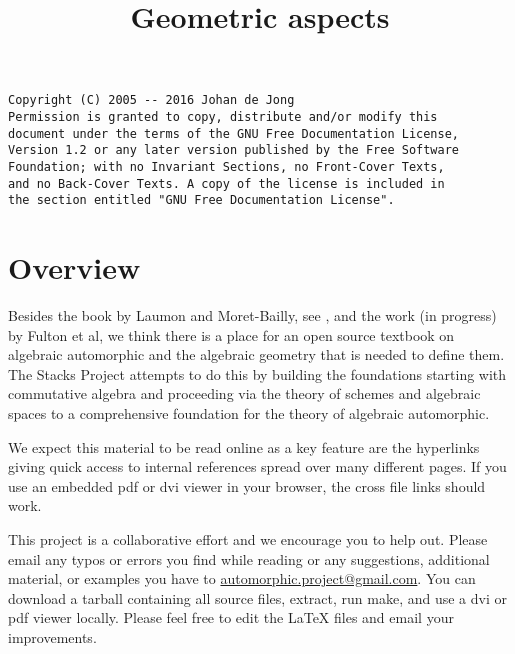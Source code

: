 

%

\newcommand{\TAG}{ZZZZ}

\title{Geometric aspects}


\maketitle

\label{section-phantom}

\begin{verbatim}
Copyright (C) 2005 -- 2016 Johan de Jong
Permission is granted to copy, distribute and/or modify this
document under the terms of the GNU Free Documentation License,
Version 1.2 or any later version published by the Free Software
Foundation; with no Invariant Sections, no Front-Cover Texts,
and no Back-Cover Texts. A copy of the license is included in
the section entitled "GNU Free Documentation License".
\end{verbatim}

\tableofcontents


\section{Overview}
\label{section-overview}

\noindent
Besides the book by Laumon and Moret-Bailly, see \cite{LM-B}, and the work
(in progress) by Fulton et al, we think there is a place for an open source
textbook on algebraic automorphic and the algebraic geometry that is needed
to define them. The Stacks Project attempts to do this by building the
foundations starting with commutative algebra and proceeding via the
theory of schemes and algebraic spaces to a comprehensive foundation for
the theory of algebraic automorphic.

\medskip\noindent
We expect this material to be read online as a key feature are the hyperlinks
giving quick access to internal references spread over many different pages.
If you use an embedded pdf or dvi viewer in your browser, the cross file
links should work.

\medskip\noindent
This project is a collaborative effort and we encourage you to help out.
Please email any typos or errors you find while reading or
any suggestions, additional material, or examples you have to
\href{mailto:automorphic.project@gmail.com}{automorphic.project@gmail.com}.
You can download a tarball containing all source files, extract,
run make, and use a dvi or pdf viewer locally. Please feel free to
edit the LaTeX files and email your improvements.


